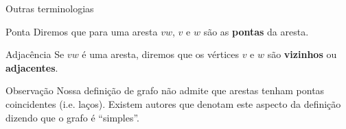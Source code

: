 \documentclass[xcolor=dvipsnames,table]{beamer}
\begin{document}
	\begin{frame}{Outras terminologias}
		\begin{block}{Ponta}
			Diremos que para uma aresta $vw$, $v$ e $w$ são as {\bf pontas} da aresta.
		\end{block}
		\pause
		\begin{block}{Adjacência}
			Se $vw$ é uma aresta, diremos que os vértices $v$ e $w$ são {\bf vizinhos} ou {\bf adjacentes}.
		\end{block}
		\pause
		\begin{block}{Observação}
			Nossa definição de grafo não admite que arestas tenham pontas coincidentes (i.e. laços). Existem autores que denotam este aspecto da definição dizendo que o grafo é ``simples''.
		\end{block}
	\end{frame}
	
	\begin{frame}
		\titlepage
	\end{frame}
	
\end{document}
